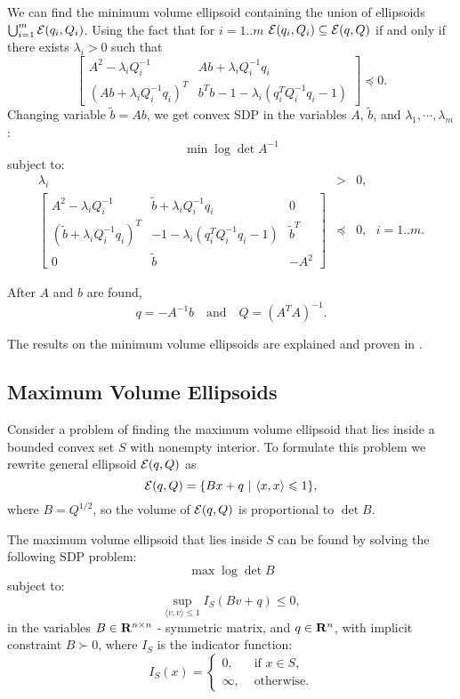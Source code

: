 We can find the minimum volume ellipsoid containing the union of ellipsoids
$\bigcup_{i=1}^m\EE(q_i,Q_i)$.
Using the fact that for $i=1..m$ $\EE(q_i,Q_i)\subseteq\EE(q,Q)$
if and only if there exists $\lambda_i>0$ such that
\[ \left[\begin{array}{cc}
A^2 - \lambda_i Q_i^{-1} & Ab + \lambda_i Q_i^{-1}q_i\\
(Ab + \lambda_i Q_i^{-1}q_i)^T & b^Tb-1 - \lambda_i (q_i^TQ_i^{-1}q_i-1) \end{array}
\right] \preceq 0 .\]
Changing variable $\tilde{b}=Ab$, we get convex SDP in the variables $A$,
$\tilde{b}$, and $\lambda_1,\cdots,\lambda_m$:
\[ \min \log \det A^{-1} \]
subject to:
\begin{eqnarray*}
\lambda_i & > & 0,\\
\left[\begin{array}{ccc}
A^2-\lambda_iQ_i^{-1} & \tilde{b}+\lambda_iQ_i^{-1}q_i & 0 \\
(\tilde{b}+\lambda_iQ_i^{-1}q_i)^T & -1-\lambda_i(q_i^TQ_i^{-1}q_i-1) & \tilde{b}^T \\
0 & \tilde{b} & -A^2\end{array}\right] & \preceq & 0, ~~~ i=1..m.
\end{eqnarray*}

After $A$ and $b$ are found,
\[ q=-A^{-1}b ~~~ \mbox{ and } ~~~ Q=(A^TA)^{-1}. \]

The results on the minimum volume ellipsoids are explained
and proven in \cite{boyd2}.

\subsection{Maximum Volume Ellipsoids}
Consider a problem of finding the maximum volume ellipsoid that lies inside
a bounded convex set $S$ with nonempty interior.
To formulate this problem we rewrite general ellipsoid $\EE(q,Q)$ as
\[ \EE(q,Q) = \{Bx + q ~|~ \langle x,x\rangle\leq 1\}, \]
where $B=Q^{1/2}$, so the volume of $\EE(q,Q)$ is proportional to $\det B$.

The maximum volume ellipsoid that lies inside $S$ can be found by solving
the following SDP problem:
\[ \max \log \det B \]
subject to:
\[ \sup_{\langle v,v\rangle\leq 1} I_S(Bv+q)\leq 0 ,\]
in the variables $B\in{\bf R}^{n\times n}$ - symmetric matrix, and
$q\in{\bf R}^n$, with implicit constraint $B\succ 0$, where $I_S$ is the
indicator function:
\[ I_S(x) = \left\{\begin{array}{ll}
0, & \mbox{ if } x\in S,\\
\infty, & \mbox{ otherwise.}\end{array}\right. \]

